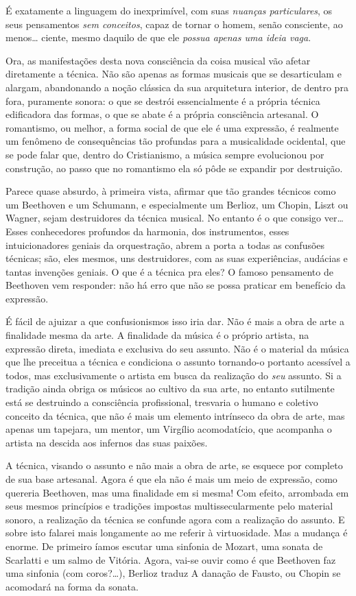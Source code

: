 É exatamente a linguagem do inexprimível, com suas \textit{nuanças
particulares}, os seus pensamentos \textit{sem conceitos}, capaz de tornar o
homem, senão consciente, ao menos\ldots{} ciente, mesmo daquilo de que ele
\textit{possua apenas uma ideia vaga}.

Ora, as manifestações desta nova consciência da coisa musical vão afetar
diretamente a técnica. Não são apenas as formas musicais que se
desarticulam e alargam, abandonando a noção clássica da sua arquitetura
interior, de dentro pra fora, puramente sonora: o que se destrói
essencialmente é a própria técnica edificadora das formas, o que se
abate é a própria consciência artesanal. O romantismo, ou melhor, a
forma social de que ele é uma expressão, é realmente um fenômeno de
consequências tão profundas para a musicalidade ocidental, que se pode
falar que, dentro do Cristianismo, a música sempre evolucionou por
construção, ao passo que no romantismo ela só pôde se expandir por
destruição.

Parece quase absurdo, à primeira vista, afirmar que tão grandes técnicos
como um Beethoven e um Schumann, e especialmente um Berlioz, um Chopin,
Liszt ou Wagner, sejam destruidores da técnica musical. No entanto é o
que consigo ver\ldots{} Esses conhecedores profundos da harmonia, dos
instrumentos, esses intuicionadores geniais da orquestração, abrem a
porta a todas as confusões técnicas; são, eles mesmos, uns destruidores,
com as suas experiências, audácias e tantas invenções geniais. O que é a
técnica pra eles? O famoso pensamento de Beethoven vem responder: não há
erro que não se possa praticar em benefício da expressão.

É fácil de ajuizar a que confusionismos isso iria dar. Não é mais a obra
de arte a finalidade mesma da arte. A finalidade da música é o próprio
artista, na expressão direta, imediata e exclusiva do seu assunto. Não é
o material da música que lhe preceitua a técnica e condiciona o assunto
tornando-o portanto acessível a todos, mas exclusivamente o artista em
busca da realização do \textit{seu} assunto. Si a tradição ainda obriga os
músicos ao cultivo da sua arte, no entanto sutilmente está se destruindo
a consciência profissional, tresvaria o humano e coletivo conceito da
técnica, que não é mais um elemento intrínseco da obra de arte, mas
apenas um tapejara, um mentor, um Virgílio acomodatício, que acompanha o
artista na descida aos infernos das suas paixões.

A técnica, visando o assunto e não mais a obra de arte, se esquece por
completo de sua base artesanal. Agora é que ela não é mais um meio de
expressão, como quereria Beethoven, mas uma finalidade em si mesma! Com
efeito, arrombada em seus mesmos princípios e tradições impostas
multissecularmente pelo material sonoro, a realização da técnica se
confunde agora com a realização do assunto. E sobre isto falarei mais
longamente ao me referir à virtuosidade. Mas a mudança é enorme. De
primeiro íamos escutar uma sinfonia de Mozart, uma sonata de Scarlatti e
um salmo de Vitória. Agora, vai-se ouvir como é que Beethoven faz uma
sinfonia (com coros?\ldots{}), Berlioz traduz A danação de Fausto, ou Chopin
se acomodará na forma da sonata.

